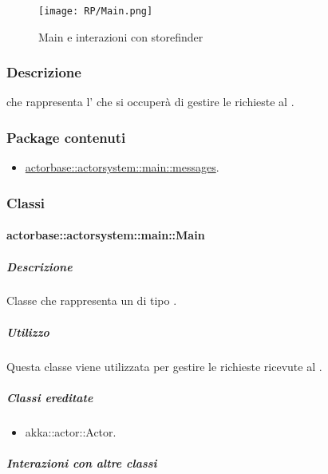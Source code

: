 \documentclass{scalatekids-article}
\begin{document}
\begin{figure}[H]
  \begin{center}
    \texttt{[image: RP/Main.png]}
    \caption{Main e interazioni con storefinder}
  \end{center}
\end{figure}

\subsubsection{Descrizione}

 che rappresenta l' che si occuperà di gestire le
richieste al .

\subsubsection{Package contenuti}

\begin{itemize}

\item \hyperref[sec:actorbase::actorsystem::main::messages]{actorbase::actorsystem::main::messages}.

\end{itemize}

\subsubsection{Classi}

\paragraph{actorbase::actorsystem::main::Main}
\label{sec:actorbase::actorsystem::main::Main}

\subparagraph{Descrizione}

Classe che rappresenta un  di tipo .

\subparagraph{Utilizzo}

Questa classe viene utilizzata per gestire le richieste ricevute al
.

\subparagraph{Classi ereditate}

\begin{itemize}

\item akka::actor::Actor.

\end{itemize}

\subparagraph{Interazioni con altre classi}
\end{document}
